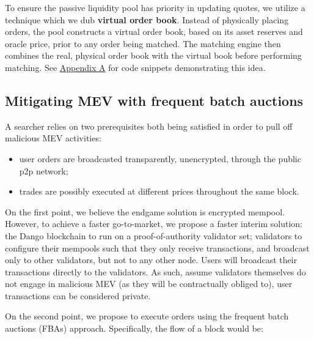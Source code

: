 \documentclass{article}
\begin{document}
To ensure the passive liquidity pool has priority in updating quotes, we utilize a technique which we dub \textbf{virtual order book}. Instead of physically placing orders, the pool constructs a virtual order book, based on its asset reserves and oracle price, prior to any order being matched. The matching engine then combines the real, physical order book with the virtual book before performing matching. See \hyperref[sec:appendixa]{Appendix A} for code snippets demonstrating this idea.

\subsection{Mitigating MEV with frequent batch auctions}

A searcher relies on two prerequisites both being satisfied in order to pull off malicious MEV activities:

\begin{itemize}
  \item user orders are broadcasted transparently, unencrypted, through the public p2p network;
  \item trades are possibly executed at different prices throughout the same block.
\end{itemize}

On the first point, we believe the endgame solution is encrypted mempool.\supercite{encryptedmempool} However, to achieve a faster go-to-market, we propose a faster interim solution: the Dango blockchain to run on a proof-of-authority validator set; validators to configure their mempools such that they only receive transactions, and broadcast only to other validators, but not to any other node. Users will broadcast their transactions directly to the validators. As such, assume validators themselves do not engage in malicious MEV (as they will be contractually obliged to), user transactions can be considered private.

On the second point, we propose to execute orders using the frequent batch auctions (FBAs) approach.\supercite{frequentbatchauctions,frequentbatchauctions2} Specifically, the flow of a block would be:
\end{document}
